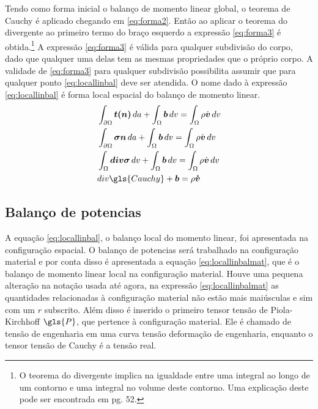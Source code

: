 Tendo como forma inicial o balanço de momento linear global, o teorema de Cauchy é aplicado chegando em \ref{eq:forma2}. Então ao aplicar o teorema do divergente ao primeiro termo do braço esquerdo a expressão \ref{eq:forma3} é obtida.\footnote{ O teorema do divergente implica na igualdade entre uma integral ao longo de um contorno e uma integral no volume deste contorno. Uma explicação deste pode ser encontrada em \cite{gurtin_fried_anand_2013} pg. 52. } A expressão \ref{eq:forma3} é válida para qualquer subdivisão do corpo, dado que qualquer uma delas tem as mesmas propriedades que o próprio corpo. A validade de \ref{eq:forma3} para qualquer subdivisão possibilita assumir que para qualquer ponto \ref{eq:locallinbal} deve ser atendida. O nome dado à expressão \ref{eq:locallinbal} é forma local espacial do balanço de momento linear. 
\begin{align}
    &\int_{\partial \Omega} \boldsymbol{t(n)} \, da + \int_{\Omega} \boldsymbol{b}\, dv = \int_{\Omega} \rho \dot{\boldsymbol{v}} \,dv \\
    &\int_{\partial \Omega} \boldsymbol{\sigma n} \,da + \int_{\Omega} \boldsymbol{b}\, dv = \int_{\Omega} \rho \dot{\boldsymbol{v}} \,dv \label{eq:forma2} \\ 
    &\int_{\Omega} \boldsymbol{div \sigma} \,dv + \int_{\Omega} \boldsymbol{b} \,dv = \int_{\Omega} \rho \dot{\boldsymbol{v}} \,dv  \label{eq:forma3} \\
    &div\gls{Cauchy} + \boldsymbol{b} = \rho \boldsymbol{\dot{v}} \label{eq:locallinbal}
\end{align}

\subsection{Balanço de potencias}

A equação \ref{eq:locallinbal}, o balanço local do momento linear, foi apresentada na configuração espacial. O balanço de potencias será trabalhado na configuração material e por conta disso é apresentada a equação \ref{eq:locallinbalmat}, que é o balanço de momento linear local na configuração material. Houve uma pequena alteração na notação usada até agora, na expressão \ref{eq:locallinbalmat} as quantidades relacionadas à configuração material não estão mais maiúsculas e sim com um $r$ subscrito. Além disso é inserido o primeiro tensor tensão de Piola-Kirchhoff $\gls{P}$, que pertence à configuração material. Ele é chamado de tensão de engenharia em uma curva tensão deformação de engenharia, enquanto o tensor tensão de Cauchy é a tensão real. 

